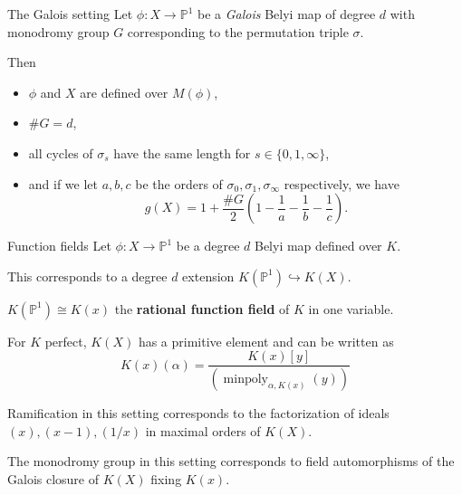 \documentclass[xcolor=dvipsnames]{beamer}
\theoremstyle{plain}
\newcommand{\PP}{\mathbb P}
\DeclareMathOperator{\minpoly}{minpoly}
\begin{document}
{    \begin{frame}{The Galois setting}
      Let $\phi\colon X\to\PP^1$ be a
      \emph{Galois} Belyi map of degree $d$
      with monodromy group $G$
      corresponding to the permutation triple
      $\sigma$.
      \pause\par
      Then
      \begin{itemize}
        \item
          $\phi$ and $X$ are defined over $M(\phi)$,
        \item
          $\#G = d$,
        \item
          all cycles of $\sigma_s$ have the same
          length for $s\in\{0,1,\infty\}$,
        \item
          and if we let $a,b,c$ be the orders
          of $\sigma_0,\sigma_1,\sigma_\infty$
          respectively,
          we have
          \[
            g(X) = 1+\frac{\#G}{2}
            \left(
              1-\frac{1}{a}
              -\frac{1}{b}
              -\frac{1}{c}
            \right).
          \]
      \end{itemize}
    \end{frame}
    \begin{frame}{Function fields}
      Let $\phi\colon X\to\PP^1$ be
      a degree $d$ Belyi map defined over $K$.
      \pause\par
      This corresponds to a degree $d$
      extension
      $K(\PP^1)\hookrightarrow K(X)$.
      \pause\par
      $K(\PP^1)\cong K(x)$
      the
      \textbf{rational function field}
      of $K$ in one variable.
      \pause\par
      For $K$ perfect,
      $K(X)$ has a primitive element
      and can be written as
      \[
        K(x)(\alpha) = \frac{K(x)[y]}{(\minpoly_{\alpha,K(x)}(y))}
      \]
      \pause\par
      Ramification in this setting corresponds
      to the factorization of ideals
      $(x),(x-1),(1/x)$
      in maximal orders of $K(X)$.
      \pause\par
      The monodromy group in this setting
      corresponds to field automorphisms
      of the Galois closure of $K(X)$
      fixing $K(x)$.
    \end{frame}
  }
\end{document}
